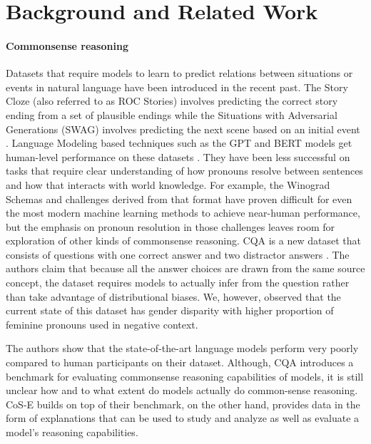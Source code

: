 \documentclass[11pt,a4paper]{article}
\begin{document}
  \section{Background and Related Work}
\vspace{-0.2cm}

\paragraph{Commonsense reasoning} 
Datasets that require models to learn to predict relations between situations or events in natural language have been introduced in the recent past.
The Story Cloze (also referred to as ROC Stories) involves predicting the correct story ending from a set of plausible endings \citep{mostafazadeh-EtAl:2016:N16-1} while the Situations with Adversarial Generations (SWAG) involves predicting the next scene based on an initial event \citep{zellers2018swag}. 
Language Modeling based techniques such as the GPT and BERT models get human-level performance on these datasets \citep{radford2018improving,devlin2018bert}. 
They have been less successful on tasks that require clear understanding of how pronouns resolve between sentences and how that interacts with world knowledge.
For example, the Winograd Schemas \citep{winograd1972understanding} and challenges derived from that format \citep{levesque2012winograd,mccann2018natural,wang2018glue} have proven difficult for even the most modern machine learning methods \citep{trinh2018simple} to achieve near-human performance, but the emphasis on pronoun resolution in those challenges leaves room for exploration of other kinds of commonsense reasoning.
CQA is a new dataset that consists of  questions with one correct answer and two distractor answers \citep{talmor2018commonsenseqa}. 
The authors claim that because all the answer choices are drawn from the same source concept, the dataset requires models to actually infer from the question rather than take advantage of distributional biases. We, however, observed that the current state of this dataset has gender disparity with higher proportion of feminine pronouns used in negative context.

The authors show that the state-of-the-art language models perform very poorly compared to human participants on their dataset. Although, CQA introduces a benchmark for evaluating commonsense reasoning capabilities of models, it is still unclear how and to what extent do models actually do common-sense reasoning. CoS-E builds on top of their benchmark, on the other hand, provides data in the form of explanations that can be used to study and analyze as well as evaluate a model's reasoning capabilities.
\end{document}
